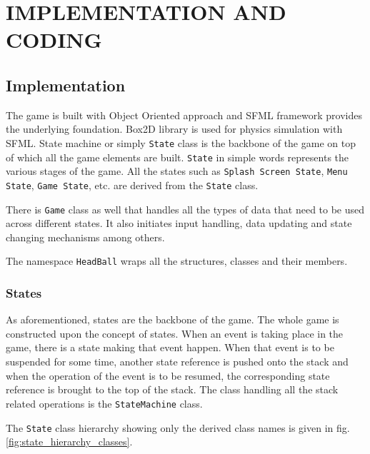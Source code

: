 \documentclass[main]{subfiles}
\begin{document}
\chapter{IMPLEMENTATION AND CODING}
\section{Implementation}

The game is built with Object Oriented approach and SFML framework provides the underlying foundation. Box2D library is used for physics simulation with SFML. State machine or simply \texttt{State} class is the backbone of the game on top of which all the game elements are built. \texttt{State} in simple words represents the various stages of the game. All the states such as \texttt{Splash Screen State}, \texttt{Menu State}, \texttt{Game State}, etc. are derived from the \texttt{State} class.

There is \texttt{Game} class as well that handles all the types of data that need to be used across different states. It also initiates input handling, data updating and state changing mechanisms among others.

The namespace \texttt{HeadBall} wraps all the structures, classes and their members.


\subsection{States}
As aforementioned, states are the backbone of the game. The whole game is constructed upon the concept of states. When an event is taking place in the game, there is a state making that event happen. When that event is to be suspended for some time, another  state reference is pushed onto the stack and when the operation of the event is to be resumed, the corresponding state reference is brought to the top of the stack. The class handling all the stack related operations is the \texttt{StateMachine} class.

The \texttt{State} class hierarchy showing only the derived class names is given in fig. \ref{fig:state_hierarchy_classes}.
\end{document}
